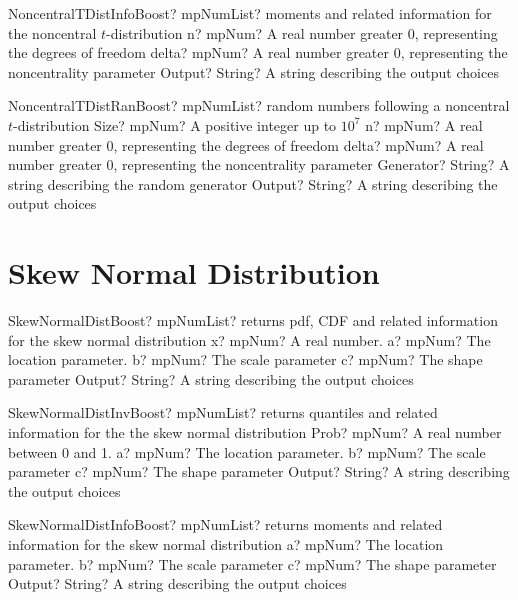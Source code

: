 \documentclass[12pt,a4paper,openany]{book}
\begin{document}
\begin{mpFunctionsExtract}
\mpFunctionThree
{NoncentralTDistInfoBoost? mpNumList? moments and related information for the noncentral $t$-distribution}
{n? mpNum? A real number greater 0, representing the degrees of freedom}
{delta? mpNum? A real number greater 0, representing the noncentrality parameter}
{Output? String? A string describing the output choices}
\end{mpFunctionsExtract}

\begin{mpFunctionsExtract}
\mpFunctionFive
{NoncentralTDistRanBoost? mpNumList? random numbers following a noncentral $t$-distribution}
{Size? mpNum? A positive integer up to $10^7$}
{n? mpNum? A real number greater 0, representing the degrees of freedom}
{delta? mpNum? A real number greater 0, representing the noncentrality parameter}
{Generator? String? A string describing the random generator}
{Output? String? A string describing the output choices}
\end{mpFunctionsExtract}

\section{Skew Normal Distribution}

\begin{mpFunctionsExtract}
\mpFunctionFive
{SkewNormalDistBoost? mpNumList? returns pdf, CDF and related information for the skew normal distribution}
{x? mpNum? A real number.}
{a? mpNum? The location parameter.}
{b? mpNum? The scale parameter}
{c? mpNum? The shape parameter}
{Output? String? A string describing the output choices}
\end{mpFunctionsExtract}

\begin{mpFunctionsExtract}
\mpFunctionFive
{SkewNormalDistInvBoost? mpNumList? returns quantiles and related information for the the skew normal distribution}
{Prob? mpNum? A real number between 0 and 1.}
{a? mpNum? The location parameter.}
{b? mpNum? The scale parameter}
{c? mpNum? The shape parameter}
{Output? String? A string describing the output choices}
\end{mpFunctionsExtract}

\begin{mpFunctionsExtract}
\mpFunctionFour
{SkewNormalDistInfoBoost? mpNumList? returns moments and related information for the skew normal distribution}
{a? mpNum? The location parameter.}
{b? mpNum? The scale parameter}
{c? mpNum? The shape parameter}
{Output? String? A string describing the output choices}
\end{mpFunctionsExtract}
\end{document}
